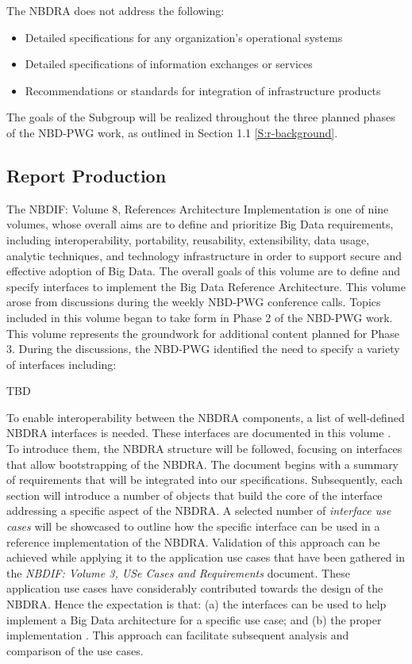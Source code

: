 \documentclass[10pt]{article}
\begin{document}
The NBDRA does not address the following:
\begin{itemize}
\item Detailed specifications for any organization’s operational systems
\item Detailed specifications of information exchanges or services
\item Recommendations or standards for integration of infrastructure products
\end {itemize}

The goals of the Subgroup will be realized throughout the three planned phases of the NBD-PWG work, as outlined in Section 1.1 \ref{S:r-background}.


\subsection{Report Production}

The NBDIF: Volume 8, References Architecture Implementation is one of nine volumes, whose overall
aims are to define and prioritize Big Data requirements, including interoperability, portability,
reusability, extensibility, data usage, analytic techniques, and technology infrastructure in order
to support secure and effective adoption of Big Data. The overall goals of this volume are to
define and specify interfaces to implement the Big Data Reference Architecture. This volume arose
from discussions during the weekly NBD-PWG conference calls. Topics included in this volume began
to take form in Phase 2 of the NBD-PWG work. This volume represents the groundwork for additional
content planned for Phase 3. During the discussions, the NBD-PWG identified the need to specify
a variety of interfaces including:

TBD

To enable interoperability between the NBDRA components, a list of well-defined NBDRA interfaces
is needed. These interfaces are documented in this volume \cite{nist-vol-8}. To introduce them,
the NBDRA structure will be followed, focusing on interfaces that allow bootstrapping of the NBDRA.
The document begins with a summary of requirements that will be integrated into our specifications.
Subsequently, each section will introduce a number of objects that build the core of the interface
addressing a specific aspect of the NBDRA. A selected number of {\it interface use cases} will be
showcased to outline how the specific interface can be used in a reference implementation of the 
NBDRA. Validation of this approach can be achieved while applying it to the application use cases
that have been gathered in the {\it NBDIF: Volume 3, USe Cases and Requirements} \cite{nist-vol-3} document.
These application use cases have considerably
contributed towards the design of the NBDRA. Hence the expectation is that: (a) the interfaces can
be used to help implement a Big Data architecture for a specific use case; and (b) the proper
implementation . This approach can facilitate subsequent analysis and comparison of the use cases. 
\end{document}
